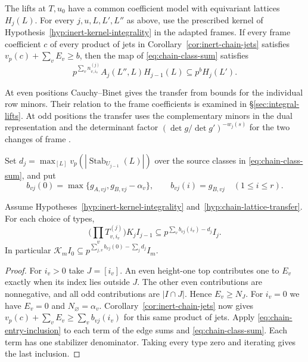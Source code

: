\begin{hypothesis}[\openinput]\label{hyp:chain-lattice-transfer}
The lifts at $T,u_0$ have a common coefficient model with equivariant
lattices $H_j(L)$. For every $j,u,L,L',L''$ as above, use the prescribed
kernel of Hypothesis~\ref{hyp:inert-kernel-integrality} in the adapted
frames. If every frame coefficient $c$ of every product of jets in
Corollary~\ref{cor:inert-chain-jets} satisfies $v_p(c)+\sum_v E_v\ge b$,
then the map of \eqref{eq:chain-class-sum} satisfies
\begin{equation}\label{eq:chain-entry-inclusion}
 p^{\sum_v n^{(j)}_{v,i_v}} A_j(L'',L)H_{j-1}(L)
          \subseteq p^b H_j(L').
\end{equation}
\end{hypothesis}

At even positions Cauchy--Binet gives the transfer from bounds for
the individual row minors. Their relation to the frame coefficients
is examined in \S\ref{sec:integral-lifts}. At odd positions the transfer
uses the complementary minors in the dual
representation and the determinant factor
$(\det g/\det g')^{-w_j(s)}$ for the two changes of frame
\citep[Theorem~11.35, Lemma~11.37 and Hypothesis~11.38]{adriazola-grh}.

Set $d_j=\max_{[L]}v_p(|\operatorname{Stab}_{U_{j-1}}(L)|)$ over the
source classes in \eqref{eq:chain-class-sum}, and put
\[
 b_{vj}(0)=\max\{g_{A,vj},g_{B,vj}-\alpha_v\},\qquad
 b_{vj}(i)=g_{B,vj}\quad(1\le i\le r).
\]
\begin{lemma}\label{lem:chain-one-step}
Assume Hypotheses~\ref{hyp:inert-kernel-integrality}
and~\ref{hyp:chain-lattice-transfer}. For each choice of types,
\[
 \Big(\prod_v T^{(j)}_{v,i_v}\Big)K_j I_{j-1}
       \subseteq p^{\sum_v b_{vj}(i_v)-d_j} I_j .
\]
In particular $\mathcal K_m I_0\subseteq
p^{\sum_{j,v}b_{vj}(0)-\sum_j d_j}I_m$.
\end{lemma}

\begin{proof}
For $i_v>0$ take $J=[i_v]$. An even height-one top contributes one
to $E_v$ exactly when its index lies outside $J$. The other even
contributions are nonnegative, and all odd contributions are
$|I\cap J|$. Hence $E_v\ge N_J$. For $i_v=0$ we have $E_v=0$ and
$N_\varnothing=\alpha_v$. Corollary~\ref{cor:inert-chain-jets} now
gives $v_p(c)+\sum_v E_v\ge\sum_v b_{vj}(i_v)$ for this same product
of jets. Apply \eqref{eq:chain-entry-inclusion} to each term of the
edge sums and \eqref{eq:chain-class-sum}. Each term has one stabilizer
denominator. Taking every type zero and iterating gives the last inclusion.
\end{proof}

